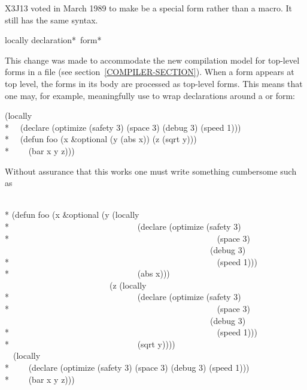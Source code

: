 \begin{newer}
X3J13 voted in March 1989  to make 
be a special form rather than a macro.  It still has the same syntax.

\begin{defspec}
locally {declaration}* {\,form}*

This change was made to accommodate the new compilation model for top-level forms
in a file (see section~\ref{COMPILER-SECTION}).
When a  form appears at top level, the forms in its body are
processed as top-level forms.  This means that one may, for example, meaningfully use
 to wrap declarations around a  or  form:
\begin{lisp}
(locally \\*
~~(declare (optimize (safety 3) (space 3) (debug 3) (speed 1))) \\*
~~(defun foo (x \&optional (y (abs x)) (z (sqrt y))) \\*
~~~~(bar x y z)))
\end{lisp}
Without assurance that this works
one must write something cumbersome such as
\begin{lisp}
 \\*
(defun foo (x \&optional (y (locally \\*
~~~~~~~~~~~~~~~~~~~~~~~~~~~~~~(declare (optimize (safety 3) \\*
~~~~~~~~~~~~~~~~~~~~~~~~~~~~~~~~~~~~~~~~~~~~~~~~~(space 3) \\
~~~~~~~~~~~~~~~~~~~~~~~~~~~~~~~~~~~~~~~~~~~~~~~~~(debug 3) \\*
~~~~~~~~~~~~~~~~~~~~~~~~~~~~~~~~~~~~~~~~~~~~~~~~~(speed 1))) \\*
~~~~~~~~~~~~~~~~~~~~~~~~~~~~~~(abs x))) \\
~~~~~~~~~~~~~~~~~~~~~~~~~(z (locally \\*
~~~~~~~~~~~~~~~~~~~~~~~~~~~~~~(declare (optimize (safety 3) \\*
~~~~~~~~~~~~~~~~~~~~~~~~~~~~~~~~~~~~~~~~~~~~~~~~~(space 3) \\
~~~~~~~~~~~~~~~~~~~~~~~~~~~~~~~~~~~~~~~~~~~~~~~~~(debug 3) \\*
~~~~~~~~~~~~~~~~~~~~~~~~~~~~~~~~~~~~~~~~~~~~~~~~~(speed 1))) \\*
~~~~~~~~~~~~~~~~~~~~~~~~~~~~~~(sqrt y)))) \\
~~(locally \\*
~~~~(declare (optimize (safety 3) (space 3) (debug 3) (speed 1))) \\*
~~~~(bar x y z)))
\end{lisp}
\end{defspec}
\end{newer}

